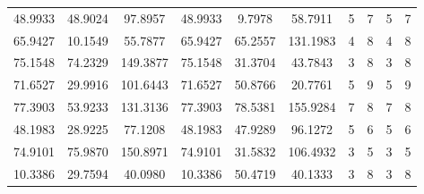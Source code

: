 \documentclass[withoutpreface,bwprint]{cumcmthesis}
\begin{document}
\begin{appendices}
\begin{table}[htbp!]
\begin{tabular}{@{}cccccccccc@{}}
				48.9933                          & 48.9024                          & 97.8957                          & 48.9933                          & 9.7978                           & 58.7911                          & 5                    & 7                    & 5                      & 7                      \\
				65.9427                          & 10.1549                          & 55.7877                          & 65.9427                          & 65.2557                          & 131.1983                         & 4                    & 8                    & 4                      & 8                      \\
				75.1548                          & 74.2329                          & 149.3877                         & 75.1548                          & 31.3704                          & 43.7843                          & 3                    & 8                    & 3                      & 8                      \\
				71.6527                          & 29.9916                          & 101.6443                         & 71.6527                          & 50.8766                          & 20.7761                          & 5                    & 9                    & 5                      & 9                      \\
				77.3903                          & 53.9233                          & 131.3136                         & 77.3903                          & 78.5381                          & 155.9284                         & 7                    & 8                    & 7                      & 8                      \\
				48.1983                          & 28.9225                          & 77.1208                          & 48.1983                          & 47.9289                          & 96.1272                          & 5                    & 6                    & 5                      & 6                      \\
				74.9101                          & 75.9870                          & 150.8971                         & 74.9101                          & 31.5832                          & 106.4932                         & 3                    & 5                    & 3                      & 5                      \\
				10.3386                          & 29.7594                          & 40.0980                          & 10.3386                          & 50.4719                          & 40.1333                          & 3                    & 8                    & 3                      & 8                      \\

\end{tabular}
\end{table}
\end{appendices}
\end{document}
